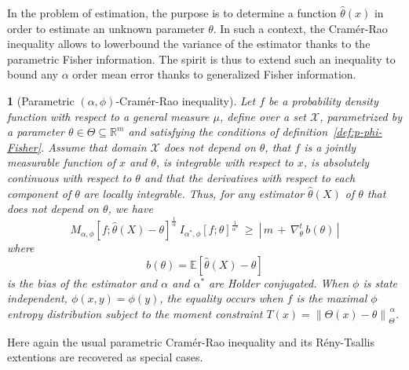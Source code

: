 \documentclass[english,sort&compress]{elsarticle}
\theoremstyle{definition}
\theoremstyle{plain}
\newtheorem{prop}{\protect\propositionname}
\theoremstyle{plain}
\providecommand{\propositionname}{Proposition}
\def\Rset{\mathbb{R}}
\def\X{\mathcal{X}}
\newcommand{\Esp}[1]{\mathbb{E}\left[ #1 \right]}
\begin{document}
In  the  problem  of  estimation,   the  purpose  is  to  determine  a  function
$\hat{\theta}(x)$ in order to estimate  an unknown parameter $\theta$. In such a
context, the  Cram\'er-Rao inequality allows  to lowerbound the variance  of the
estimator thanks  to the  parametric Fisher information.  The spirit is  thus to
extend  such an  inequality to  bound any  $\alpha$ order  mean error  thanks to
generalized Fisher information.
%
\begin{prop}[Parametric                              $(\alpha,\phi)$-Cram\'er-Rao
  inequality]\label{prop:p-phi-CR}
  Let $f$  be a probability density  function with respect to  a general measure
  $\mu$, define over a set $\X$,  parametrized by a parameter $\theta \in \Theta
  \subseteq      \Rset^m$     and      satisfying     the      conditions     of
  definition~\ref{def:p-phi-Fisher}. Assume that domain  $\X$ does not depend on
  $\theta$, that  $f$ is a jointly  measurable function of $x$  and $\theta$, is
  integrable  with respect  to $x$,  is  absolutely continuous  with respect  to
  $\theta$ and that  the derivatives with respect to  each component of $\theta$
  are  locally  integrable. Thus,  for  any  estimator $\widehat{\theta}(X)$  of
  $\theta$ that does not depend on $\theta$, we have
  \begin{equation}\label{eq:phi-CR}
  M_{\alpha,\phi} \! \left[ f ; \widehat{\theta}(X) - \theta
  \right]^{\frac{1}{\alpha}} \: I_{\alpha^*\!,\phi}[f;\theta]^{\frac{1}{\alpha^*}}
  \: \ge \: \left| \, m \, + \, \nabla_\theta^t \, b(\theta) \, \right|
  \end{equation}
  where
  \begin{equation}
  b(\theta) = \Esp{\widehat{\theta}(X) - \theta}
  \end{equation}
  is  the  bias  of  the  estimator  and  $\alpha$  and  $\alpha^*$  are  Holder
  conjugated.   When $\phi$  is state  independent, $\phi(x,y)  =  \phi(y)$, the
  equality occurs when $f$ is the maximal $\phi$ entropy distribution subject to
  the moment constraint $T(x) = \left\| \Theta(x) - \theta \right\|_{\Theta}^{\,
    \alpha}$.
\end{prop}
%
Here again  the usual parametric Cram\'er-Rao inequality  and its R\'eny-Tsallis
extentions are recovered as special cases.
\end{document}
